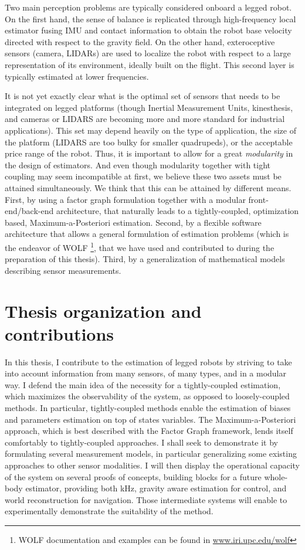 Two main perception problems are typically considered onboard a legged robot. On the first hand, the sense of balance is replicated through high-frequency
local estimator fusing IMU and contact information to obtain the robot base velocity directed with respect to the gravity field. On the other hand,
exteroceptive sensors (camera, LIDARs) are used to localize the robot with respect to a large representation of its environment, ideally built on the flight.
This second layer is typically estimated at lower frequencies.

It is not yet exactly clear what is the optimal set of sensors that needs to be integrated on legged platforms (though Inertial Measurement Units, kinesthesis, and 
cameras or LIDARS are becoming more and more standard for industrial applications). This set may depend heavily on the type of application,
the size of the platform (LIDARS are too bulky for smaller quadrupeds), or the acceptable price range of the robot. Thus, it is important to allow
for a great \textit{modularity} in the design of estimators.
And even though modularity together with tight coupling may seem incompatible at first, we believe these two assets must be attained simultaneously.
We think that this can be attained by different means. 
First, by using a factor graph formulation together with a modular front-end/back-end architecture, that naturally leads to a tightly-coupled, optimization based, Maximum-a-Posteriori estimation.
Second, by a flexible software architecture
that allows a general formulation of estimation problems (which is the endeavor of WOLF \cite{sola2021wolf} \footnote{WOLF documentation and examples can be 
found in \url{www.iri.upc.edu/wolf}}, that we have used and contributed to during the preparation of this thesis). Third, by a generalization of mathematical
models describing sensor measurements. 
 




\section{Thesis organization and contributions}

In this thesis, I contribute to the estimation of legged robots by striving to take into account information from
many sensors, of many types, and in a modular way. I defend the main idea of the necessity for a tightly-coupled estimation, which maximizes the observability
of the system, as opposed to loosely-coupled methods. In particular, tightly-coupled methods enable the estimation of biases and parameters estimation
on top of states variables. The Maximum-a-Posteriori approach, which is best described with the Factor Graph framework, lends itself comfortably 
to tightly-coupled approaches. I shall seek to demonstrate it by formulating several measurement models, in particular generalizing some existing approaches to other sensor modalities.
I will then display the operational capacity of the system on several proofs of concepts, building blocks for a future whole-body estimator, providing both kHz, gravity aware
estimation for control, and world reconstruction for navigation. Those intermediate systems will enable to experimentally demonstrate the suitability of the method.


